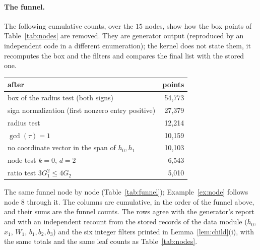 \documentclass[11pt]{article}
\theoremstyle{remark}
\begin{document}
\paragraph{The funnel.} The following cumulative counts, over the $15$ nodes, show how the box points of Table~\ref{tab:nodes} are removed. They are generator output (reproduced by an independent code in a different enumeration); the kernel does not state them, it recomputes the box and the filters and compares the final list with the stored one.
\begin{center}
\small
\begin{tabular}{lr}
\toprule
after & points\\
\midrule
box of the radius test (both signs) & 54{,}773\\
sign normalization (first nonzero entry positive) & 27{,}379\\
radius test & 12{,}214\\
$\gcd(\tau)=1$ & 10{,}159\\
no coordinate vector in the span of $h_0,h_1$ & 10{,}103\\
node test $k=0$, $d=2$ & 6{,}543\\
ratio test $3G_1^2\le4G_2$ & 5{,}010\\
\bottomrule
\end{tabular}
\end{center}
The same funnel node by node (Table~\ref{tab:funnel}); Example~\ref{ex:node} follows node $8$ through it. The columns are cumulative, in the order of the funnel above, and their sums are the funnel counts. The rows agree with the generator's report and with an independent recount from the stored records of the data module ($h_0$, $x_1$, $W_1$, $b_1,b_2,b_3$) and the six integer filters printed in Lemma~\ref{lem:child}(i), with the same totals and the same leaf counts as Table~\ref{tab:nodes}.
\end{document}
